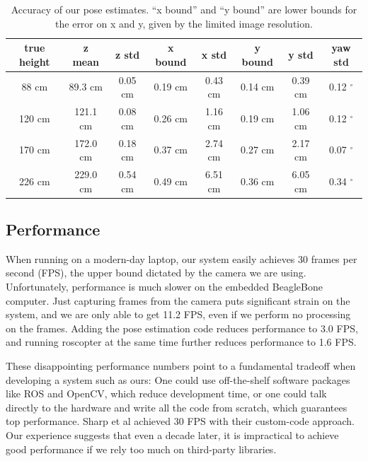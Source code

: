 \documentclass[10pt]{scrartcl} %
\begin{document}
\begin{table}[h!]
    \centering
    \begin{tabular}{c|cc|cc|cc|c}
        true height & z mean    & z std     & x bound   & x std     & y bound   & y std     & yaw std \\
        \hline
         88 cm      & 89.3 cm   & 0.05 cm   & 0.19 cm   & 0.43 cm   & 0.14 cm   & 0.39 cm   & 0.12 $^{\circ}$ \\
        120 cm      & 121.1 cm  & 0.08 cm   & 0.26 cm   & 1.16 cm   & 0.19 cm   & 1.06 cm   & 0.12 $^{\circ}$ \\
        170 cm      & 172.0 cm  & 0.18 cm   & 0.37 cm   & 2.74 cm   & 0.27 cm   & 2.17 cm   & 0.07 $^{\circ}$ \\
        226 cm      & 229.0 cm  & 0.54 cm   & 0.49 cm   & 6.51 cm   & 0.36 cm   & 6.05 cm   & 0.34 $^{\circ}$ \\
    \end{tabular}
    \caption{
        Accuracy of our pose estimates. ``x bound'' and ``y bound'' are lower
        bounds for the error on x and y, given by the limited image resolution.
    }
    \label{tab:pose-accu}
\end{table}

\subsection{Performance}

When running on a modern-day laptop, our system easily achieves 30 frames per
second (FPS), the upper bound dictated by the camera we are using.
Unfortunately, performance is much slower on the embedded BeagleBone computer.
Just capturing frames from the camera puts significant strain on the system,
and we are only able to get 11.2 FPS, even if we perform no processing on the
frames. Adding the pose estimation code reduces performance to 3.0 FPS, and
running roscopter at the same time further reduces performance to 1.6 FPS.

These disappointing performance numbers point to a fundamental tradeoff when
developing a system such as ours: One could use off-the-shelf software packages
like ROS and OpenCV, which reduce development time, or one could talk directly
to the hardware and write all the code from scratch, which guarantees top
performance. Sharp et al \cite{sharp_et_al_2001} achieved 30 FPS with their
custom-code approach. Our experience suggests that even a decade later, it is
impractical to achieve good performance if we rely too much on third-party
libraries.
\end{document}

